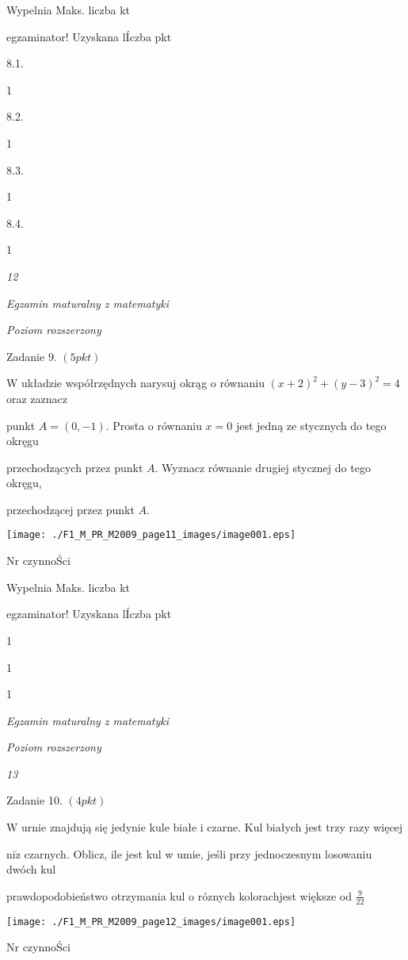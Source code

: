 \documentclass[a4paper,12pt]{article}
\begin{document}
Wypelnia Maks. liczba kt

egzaminator! Uzyskana lÍczba pkt

8.1.

1

8.2.

1

8.3.

1

8.4.

1





{\it 12}

{\it Egzamin maturalny z matematyki}

{\it Poziom rozszerzony}

Zadanie 9. $(5pkt)$

$\mathrm{W}$ układzie współrzędnych narysuj okrąg o równaniu $(x+2)^{2}+(y-3)^{2}=4$ oraz zaznacz

punkt $A=(0,-1)$. Prosta o równaniu $x=0$ jest jedną ze stycznych do tego okręgu

przechodzących przez punkt $A$. Wyznacz równanie drugiej stycznej do tego okręgu,

przechodzącej przez punkt $A.$
\begin{center}
\texttt{[image: ./F1\_M\_PR\_M2009\_page11\_images/image001.eps]}
\end{center}
Nr czynnoŚci

Wypelnia Maks. liczba kt

egzaminator! Uzyskana lÍczba pkt

1

1

1





{\it Egzamin maturalny z matematyki}

{\it Poziom rozszerzony}

{\it 13}

Zadanie 10. $(4pkt)$

$\mathrm{W}$ urnie znajdują się jedynie kule białe i czarne. Kul białych jest trzy razy więcej

$\mathrm{n}\mathrm{i}\dot{\mathrm{z}}$ czarnych. Oblicz, ile jest kul w umie, jeśli przy jednoczesnym losowaniu dwóch kul

prawdopodobieństwo otrzymania kul o róznych kolorachjest większe od $\displaystyle \frac{9}{22}$
\begin{center}
\texttt{[image: ./F1\_M\_PR\_M2009\_page12\_images/image001.eps]}
\end{center}
Nr czynnoŚci
\end{document}
